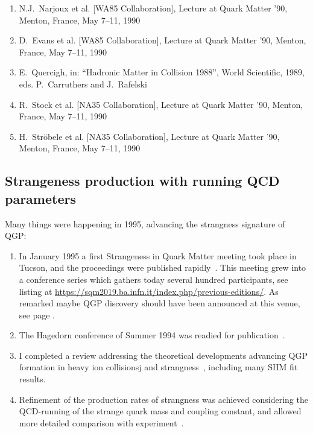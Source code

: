 \begin{mdframed}[linecolor=gray,roundcorner=12pt,backgroundcolor=Dandelion!15,linewidth=1pt,leftmargin=0cm,rightmargin=0cm,topline=true,bottomline=true,skipabove=12pt]
{\begin{enumerate}
\item  N.J.~Narjoux et al. [WA85 Collaboration], Lecture at Quark
Matter '90, Menton, France, May 7--11, 1990 

\item D.~Evans et al. [WA85 Collaboration], Lecture at Quark Matter '90, Menton, France, May 7--11, 1990 

\item E.~Quercigh, in: ``Hadronic Matter in Collision 1988'', World Scientific, 1989, eds. P.~Carruthers and J.~Rafelski
 
\item R.~Stock et al. [NA35 Collaboration], Lecture at Quark Matter
'90, Menton, France, May 7--11, 1990

\item  H.~Str\"obele et al. [NA35 Collaboration], Lecture at Quark Matter '90, Menton, France, May 7--11, 1990

\end{enumerate}
}
 
\end{mdframed}


\subsection{Strangeness production with running QCD parameters}\label{QCDrunning}

Many things were happening in 1995, advancing the strangness signature of QGP:
\begin{enumerate}
\item
In January 1995 a first Strangeness in Quark Matter meeting took place in Tucson, and the proceedings were published rapidly~\cite{Rafelski:1995zq}. This meeting grew into a conference series which gathers today several hundred participants, see listing at \url{https://sqm2019.ba.infn.it/index.php/previous-editions/}. As remarked maybe QGP discovery should have been announced at this venue, see page \pageref{SQM95an}.
\item
The Hagedorn conference of Summer 1994  was readied for publication~\cite{Letessier:1995ic}.
\item 
I completed a review addressing the theoretical developments advancing QGP formation in heavy ion collisionsj and strangness~\cite{Rafelski:1996hf}, including many SHM fit results.
\item
Refinement of the production rates of strangness was achieved considering the QCD-running of the strange quark mass and coupling constant, and allowed more detailed comparison with experiment~\cite{Letessier:1996ad}.  
\end{enumerate}
 

